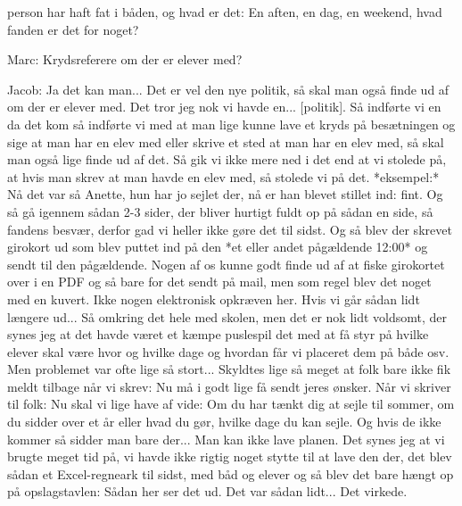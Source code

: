 person har haft fat i båden, og hvad er det: En aften, en dag, en weekend, hvad fanden er det for noget? 

Marc: Krydsreferere om der er elever med? 

Jacob: Ja det kan man... Det er vel den nye politik, så skal man også finde ud af om der er elever med. Det tror jeg nok vi havde en... [politik]. Så indførte vi en da det kom så indførte vi med at man lige kunne lave et kryds på besætningen og sige at man har en elev med eller skrive et sted at man har en elev med, så skal man også lige finde ud af det. Så gik vi ikke mere ned i det end at vi stolede på, at hvis man skrev at man havde en elev med, så stolede vi på det. *eksempel:* Nå det var så Anette, hun har jo sejlet der, nå er han blevet stillet ind: fint. Og så gå igennem sådan 2-3 sider, der bliver hurtigt fuldt op på sådan en side, så fandens besvær, derfor gad vi heller ikke gøre det til sidst. 
Og så blev der skrevet girokort ud som blev puttet ind på den *et eller andet pågældende 12:00* og sendt til den pågældende. Nogen af os kunne godt finde ud af at fiske girokortet over i en PDF og så bare for det sendt på mail, men som regel blev det noget med en kuvert. Ikke nogen elektronisk opkræven her. 
Hvis vi går sådan lidt længere ud... Så omkring det hele med skolen, men det er nok lidt voldsomt, der synes jeg at det havde været et kæmpe puslespil det med at få styr på hvilke elever skal være hvor og hvilke dage og hvordan får vi placeret dem på både osv. Men problemet var ofte lige så stort... Skyldtes lige så meget at folk bare ikke fik meldt tilbage når vi skrev: Nu må i godt lige få sendt jeres ønsker. Når vi skriver til folk: Nu skal vi lige have af vide: Om du har tænkt dig at sejle til sommer, om du sidder over et år eller hvad du gør, hvilke dage du kan sejle. Og hvis de ikke kommer så sidder man bare der... Man kan ikke lave planen. Det synes jeg at vi brugte meget tid på, vi havde ikke rigtig noget stytte til at lave den der, det blev sådan et Excel-regneark til sidst, med båd og elever og så blev det bare hængt op på opslagstavlen: Sådan her ser det ud. Det var sådan lidt... Det virkede.
